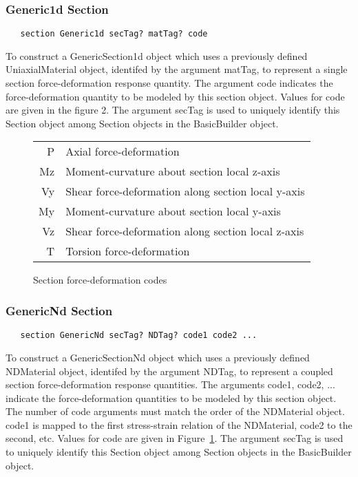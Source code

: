 \documentclass[12pt]{article}
\begin{document}
\subsubsection{Generic1d Section}
{\sf\small
\begin{verbatim}
   section Generic1d secTag? matTag? code
\end{verbatim}
}

To construct a GenericSection1d object which uses a previously defined
UniaxialMaterial object, identifed by the argument matTag, to represent
a single section force-deformation response quantity. The argument code indicates
the force-deformation quantity to be modeled by this section object.
Values for code are given in the figure 2. The 
argument secTag is used to uniquely identify this Section object among 
Section objects in the BasicBuilder object. 

\begin{figure}[htpb]
\begin{center}
\begin{tabular}{|r||l|} \hline
 P & Axial force-deformation \\
 Mz & Moment-curvature about section local z-axis \\
 Vy & Shear force-deformation along section local y-axis \\
 My & Moment-curvature about section local y-axis \\
 Vz & Shear force-deformation along section local z-axis \\
 T & Torsion force-deformation \\ \hline
\end{tabular}
\caption{Section force-deformation codes}
\label{sectionCodes}
\end{center}
\end{figure}

\subsubsection{GenericNd Section}
{\sf\small
\begin{verbatim}
   section GenericNd secTag? NDTag? code1 code2 ...
\end{verbatim}
}

To construct a GenericSectionNd object which uses a previously defined
NDMaterial object, identifed by the argument NDTag, to represent
a coupled section force-deformation response quantities. The arguments code1, 
code2, ... indicate the force-deformation quantities to be modeled by
this section object. The number of code arguments must match the order
of the NDMaterial object. code1 is mapped to the first stress-strain
relation of the NDMaterial, code2 to the second, etc. Values for code
are given in Figure~\ref{sectionCodes}. The argument secTag is used to
uniquely identify this Section object among Section objects in the
BasicBuilder object. 
\end{document}

